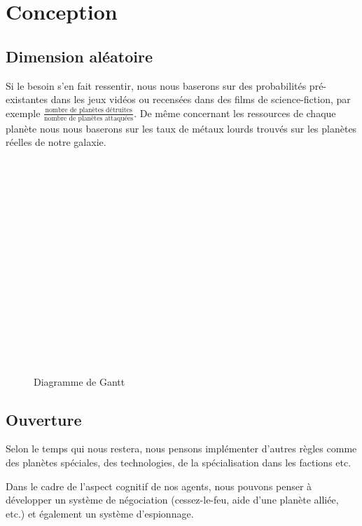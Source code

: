 \documentclass{article}
\begin{document}
  \section{Conception}
    \subsection{Dimension aléatoire}
      Si le besoin s'en fait ressentir, nous nous baserons sur des probabilités pré-existantes dans les jeux vidéos ou recensées dans des films de science-fiction, par exemple $\displaystyle \frac{\text{nombre de planètes détruites}}{\text{nombre de planètes attaquées}} $. De même concernant les ressources de chaque planète nous nous baserons sur les taux de métaux lourds trouvés sur les planètes réelles de notre galaxie.
    
      \begin{figure}[H]
        \begin{ganttchart}{1}{12}
           \\
           \\
           \\
             \\
             \\
             \\
             \\
             \ganttnewline
           \\
             \\
             \\
             \ganttnewline
		       \\
             \\
      		   \\
      		   \\
      		   \\
        \end{ganttchart}
        \caption{Diagramme de Gantt}
      \end{figure}
 
 \subsection{Ouverture}
    Selon le temps qui nous restera, nous pensons implémenter d'autres règles comme des planètes spéciales, des technologies, de la spécialisation dans les factions etc.

    Dans le cadre de l'aspect cognitif de nos agents, nous pouvons penser à développer un système de négociation (cessez-le-feu, aide d'une planète alliée, etc.) et également un système d'espionnage.
\end{document}
